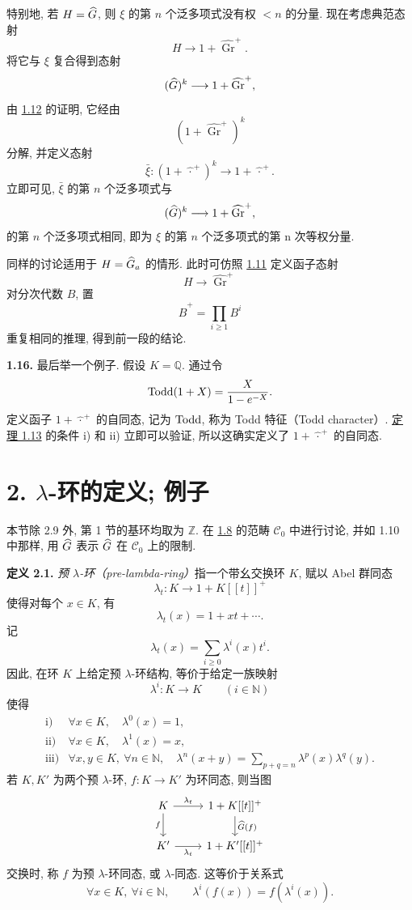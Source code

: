 特别地, 若 \(H=\widehat G\), 则 \(\xi\) 的第 \(n\) 个泛多项式没有权 \(<n\) 的分量. 现在考虑典范态射
\[
  H\longrightarrow 1+\widehat{\operatorname{Gr}}^{+}.
\]
将它与 \(\xi\) 复合得到态射
\[
  (\widehat G)^k\longrightarrow 1+\widehat{\operatorname{Gr}}^{+},
\]
由 \hyperlink{sga6.e05.lem.1-12}{1.12} 的证明, 它经由
\[
  (1+\widehat{\operatorname{Gr}}^{+})^k
\]
分解, 并定义态射
\[
  \bar\xi:(1+\widehat{\,\cdot\,}^{+})^k\longrightarrow 1+\widehat{\,\cdot\,}^{+}.
\]
立即可见, \(\bar\xi\) 的第 \(n\) 个泛多项式与
\[
  (\widehat G)^k\longrightarrow 1+\widehat{\operatorname{Gr}}^{+},
\]
的第 \(n\) 个泛多项式相同, 即为 \(\xi\) 的第 \(n\) 个泛多项式的第 n 次等权分量.

同样的讨论适用于 \(H=\widehat G_a\) 的情形. 此时可仿照 \hyperlink{sga6.e05.para.1-11}{1.11} 定义函子态射
\[
  H\longrightarrow \widehat{\operatorname{Gr}}^{+}
\]
对分次代数 \(B\), 置
\[
  \widehat B^{+}=\prod_{i\geq 1}B^i
\]
重复相同的推理, 得到前一段的结论.

\textbf{1.16.} 最后举一个例子. 假设 \(K=\mathbb Q\). 通过令
\[
  \operatorname{Todd}(1+X)=\frac{X}{1-e^{-X}}.
\]
定义函子 \(1+\widehat{\,\cdot\,}^{+}\) 的自同态, 记为 \(\operatorname{Todd}\), 称为 Todd 特征（Todd character）. \hyperlink{sga6.e05.thm.1-13}{定理 1.13} 的条件 i) 和 ii) 立即可以验证, 所以这确实定义了 \(1+\widehat{\,\cdot\,}^{+}\) 的自同态.

\section*{2. \(\lambda\)-环的定义; 例子}

本节除 2.9 外, 第 1 节的基环均取为 \(\mathbb Z\). 在 \hyperlink{sga6.e05.para.1-8}{1.8} 的范畴 \(\mathcal C_0\) 中进行讨论, 并如 1.10 中那样, 用 \(\widehat G\) 表示 \(\widehat G\) 在 \(\mathcal C_0\) 上的限制.

\textbf{定义 2.1.} \emph{预 \(\lambda\)-环（pre-lambda-ring）}指一个带幺交换环 \(K\), 赋以 Abel 群同态
\[
  \lambda_t:K\longrightarrow 1+K[[t]]^+
\]
使得对每个 \(x\in K\), 有
\[
  \lambda_t(x)=1+xt+\cdots.
\]
记
\[
  \lambda_t(x)=\sum_{i\geq 0}\lambda^i(x)t^i.
\]
因此, 在环 \(K\) 上给定预 \(\lambda\)-环结构, 等价于给定一族映射
\[
  \lambda^i:K\longrightarrow K\qquad (i\in\mathbb N)
\]
使得
\[
\begin{array}{ll}
\text{i)}&\forall x\in K,\quad \lambda^0(x)=1,\\[0.3em]
\text{ii)}&\forall x\in K,\quad \lambda^1(x)=x,\\[0.3em]
\text{iii)}&\forall x,y\in K,\ \forall n\in\mathbb N,\quad
\lambda^n(x+y)=\displaystyle\sum_{p+q=n}\lambda^p(x)\lambda^q(y).
\end{array}
\]
若 \(K,K'\) 为两个预 \(\lambda\)-环, \(f:K\to K'\) 为环同态, 则当图
\[
\begin{tikzcd}
K \arrow[r,"\lambda_t"] \arrow[d,"f"'] &
1+K[[t]]^+ \arrow[d,"\Ghat(f)"]\\
K' \arrow[r,"\lambda_t"'] &
1+K'[[t]]^+
\end{tikzcd}
\]
交换时, 称 \(f\) 为预 \(\lambda\)-环同态, 或 \(\lambda\)-同态. 这等价于关系式
\[
  \forall x\in K,\ \forall i\in\mathbb N,\qquad
  \lambda^i(f(x))=f(\lambda^i(x)).
\]

